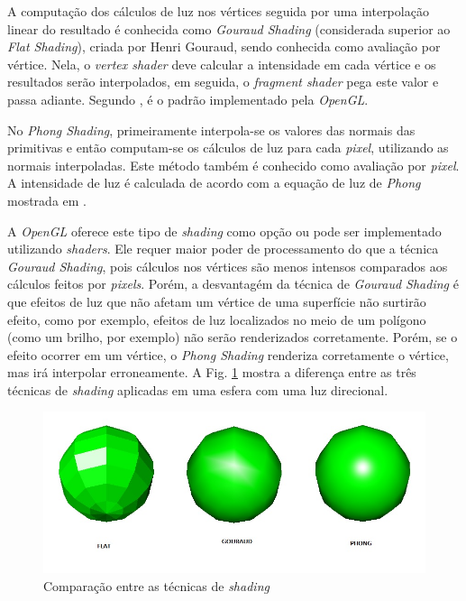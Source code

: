 	A computação dos cálculos de luz nos  vértices seguida por uma interpolação linear do resultado é conhecida como \textit{Gouraud Shading} (considerada superior ao \textit{Flat Shading}), criada por Henri Gouraud, sendo conhecida como avaliação por vértice. Nela, o \textit{vertex shader} deve calcular a intensidade em cada vértice e os resultados serão interpolados, em seguida, o \textit{fragment shader} pega este valor e passa adiante. Segundo  \cite{guha2011}, é o padrão implementado pela  \textit{OpenGL}. 

	No \textit{Phong Shading}, primeiramente interpola-se os valores das normais das primitivas e então computam-se os cálculos de luz para cada \textit{pixel}, utilizando as normais interpoladas. Este método também é conhecido como avaliação por \textit{pixel}. A intensidade de luz é calculada de acordo com a equação de luz de \textit{Phong} mostrada em \cite{guha2011}.

	 A \textit{OpenGL} oferece este tipo de \textit{shading} como opção ou pode ser implementado utilizando \textit{shaders}.  Ele requer maior poder de processamento do que a técnica \textit{Gouraud Shading}, pois cálculos nos vértices são menos intensos comparados aos cálculos feitos por \textit{pixels}. Porém, a desvantagém da técnica de \textit{Gouraud Shading} é que efeitos de luz que não afetam um vértice de uma superfície não surtirão efeito, como por exemplo, efeitos de luz localizados no meio de um polígono (como um brilho, por exemplo) não serão renderizados corretamente. Porém, se o efeito ocorrer em um vértice, o \textit{Phong Shading} renderiza corretamente o vértice, mas irá interpolar erroneamente. A Fig. \ref{fgp} mostra a diferença entre as três técnicas de \textit{shading} aplicadas em uma esfera com uma luz direcional. 

	\begin{figure}[h]
	\centering
		\includegraphics[keepaspectratio=true,scale=0.7]{figuras/flatgp.jpg}
	\caption{Comparação entre as técnicas de \textit{shading}}
	\label{fgp}
	\end{figure}


